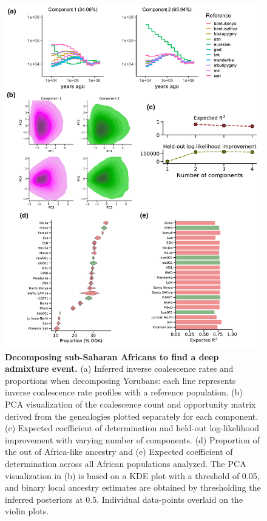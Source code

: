 \begin{figure}[h!]
    \centering
    \includegraphics[width=\linewidth]{figures/gb_deepadmix/gb_real_deep_1.pdf}
    \captionsetup{width=\textwidth+3cm}
    \caption{
    \footnotesize
    \textbf{Decomposing sub-Saharan Africans to find a deep admixture event.} (a) Inferred inverse coalescence rates and proportions when decomposing Yorubans: each line represents inverse coalescence rate profiles with a reference population. (b) PCA visualization of the coalescence count and opportunity matrix derived from the genealogies plotted separately for each component. (c) Expected coefficient of determination and held-out log-likelihood improvement with varying number of components. (d) Proportion of the out of Africa-like ancestry and (e) Expected coefficient of determination across all African populations analyzed. The PCA visualization in (b) is based on a KDE plot with a threshold of 0.05, and binary local ancestry estimates are obtained by thresholding the inferred posteriors at 0.5. Individual data-points overlaid on the violin plots. 
    }
    \label{fig:gb_deepadmix_1}
\end{figure}

